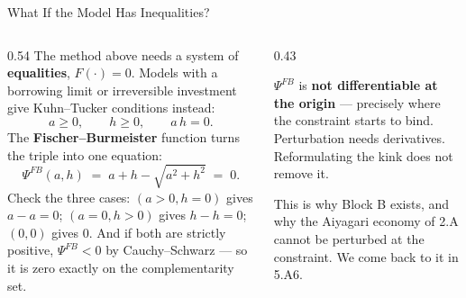 \begin{frame}{What If the Model Has Inequalities?}
\begin{columns}[T]
\begin{column}{0.54\textwidth}
\small
The method above needs a system of \textbf{equalities}, $F(\cdot)=0$. Models with a borrowing limit or irreversible investment give Kuhn--Tucker conditions instead:
\[
  a\ge 0,\qquad h\ge 0,\qquad a\,h=0 .
\]
The \textbf{Fischer--Burmeister} function turns the triple into one equation:
\[
  \Psi^{FB}(a,h)\;=\;a+h-\sqrt{a^{2}+h^{2}}\;=\;0 .
\]
Check the three cases: $(a>0,h=0)$ gives $a-a=0$; $(a=0,h>0)$ gives $h-h=0$; $(0,0)$ gives $0$. And if both are strictly positive, $\Psi^{FB}<0$ by Cauchy--Schwarz --- so it is zero exactly on the complementarity set.
\end{column}
\begin{column}{0.43\textwidth}
\begin{cautionbox}[title=\textbf{But be honest about it}]\small
$\Psi^{FB}$ is \textbf{not differentiable at the origin} --- precisely where the constraint starts to bind. Perturbation needs derivatives. Reformulating the kink does not remove it.
\end{cautionbox}
\medskip
\begin{examplebox}\footnotesize
This is why Block B exists, and why the Aiyagari economy of 2.A cannot be perturbed at the constraint. We come back to it in 5.A6.
\end{examplebox}
\end{column}
\end{columns}
\vspace{1mm}
\end{frame}

